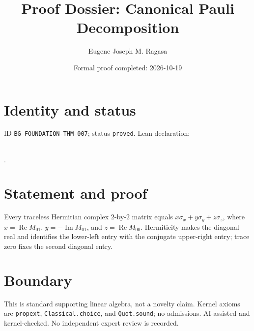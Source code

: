 \documentclass[11pt]{article}
\title{Proof Dossier: Canonical Pauli Decomposition}\author{Eugene Joseph M. Ragasa}\date{Formal proof completed: 2026-10-19}
\begin{document}
\maketitle
\section{Identity and status}
ID \texttt{BG-FOUNDATION-THM-007}; status \texttt{proved}. Lean declaration:
\par{}\\
{\tiny{}}.
\section{Statement and proof}
Every traceless Hermitian complex $2$-by-$2$ matrix equals
$x\sigma_x+y\sigma_y+z\sigma_z$, where
$x=\operatorname{Re}M_{01}$, $y=-\operatorname{Im}M_{01}$, and
$z=\operatorname{Re}M_{00}$. Hermiticity makes the diagonal real and identifies the
lower-left entry with the conjugate upper-right entry; trace zero fixes the second
diagonal entry.
\section{Boundary}
This is standard supporting linear algebra, not a novelty claim. Kernel axioms are
\texttt{propext}, \texttt{Classical.choice}, and \texttt{Quot.sound}; no admissions.
AI-assisted and kernel-checked. No independent expert review is recorded.
\end{document}
